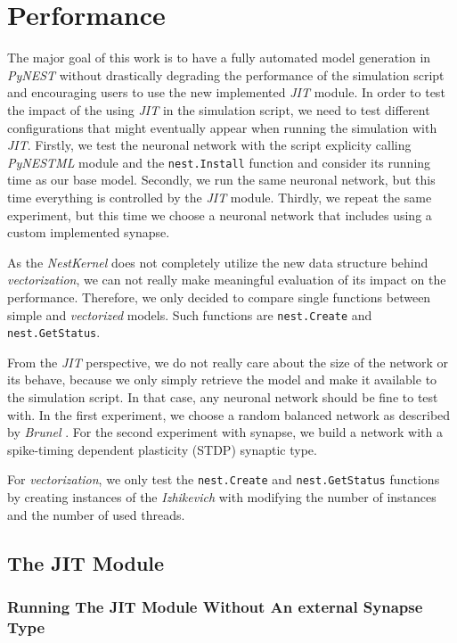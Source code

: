 \chapter{Performance}
 \label{chap:perf}
 
 The major goal of this work is to have a fully automated model generation in \emph{PyNEST} without drastically degrading the performance of the simulation script and encouraging users to use the new implemented \emph{JIT} module. In order to test the impact of the using \emph{JIT} in the simulation script, we need to test different configurations that might eventually appear when running the simulation with \emph{JIT}. Firstly, we test the neuronal network with the script explicity calling \emph{PyNESTML} module and the \texttt{nest.Install} function and  consider its running time as our base model. Secondly, we run the same neuronal network, but this time everything is controlled by the \emph{JIT} module. Thirdly, we repeat the same experiment, but this time we choose a neuronal network that includes using a custom implemented synapse.
 
 As the \emph{NestKernel} does not completely utilize the new data structure behind \emph{vectorization}, we can not really make meaningful evaluation of its impact on the performance. Therefore, we only decided to compare single functions between simple and \emph{vectorized} models. Such functions are \texttt{nest.Create} and \texttt{nest.GetStatus}.
 
 From the \emph{JIT} perspective, we do not really care about the size of the network or its behave, because we only simply retrieve the model and make it available to the simulation script. In that case, any neuronal network should be fine to test with. In the first experiment, we choose a random balanced network as  described by \emph{Brunel} \citep{brunel2000dynamics}. For the second experiment with synapse, we build a network with a spike-timing dependent plasticity (STDP) synaptic type.
 
 
 For \emph{vectorization}, we only test the \texttt{nest.Create} and \texttt{nest.GetStatus} functions by creating instances of the \emph{Izhikevich} \citep{1257420} with modifying the number of instances and the number of used threads.
 
\section{The JIT Module}

\subsection*{Running The JIT Module Without An external Synapse Type}

